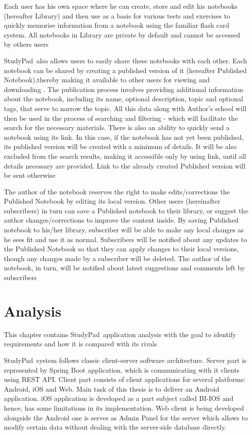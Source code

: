\documentclass[thesis=B,english]{FITthesis}[2012/10/20]
\newcommand{\appname}{StudyPad}
\begin{document}
Each user has his own space where he can create, store and edit his notebooks (hereafter Library) and then use as a basis for various tests and exercises to quickly memorise information from a notebook using the familiar flash card system. All notebooks in Library are private by default and cannot be accessed by others users

\appname\ also allows users to easily share these notebooks with each other. Each notebook can be shared by creating a published version of it (hereafter Published Notebook),thereby making it available to other users for viewing and downloading .
The publication process involves providing additional information about the notebook, including its name, optional description, topic and optional tags, that serve to narrow the topic. All this data along with Author's school will then be used in the process of searching and filtering - which will facilitate the search for the necessary materials. There is also an ability to quickly send a notebook using its link. In this case, if the notebook has not yet been published, its published version will be created with a minimum of details. It will be also excluded from the search results, making it accessible only by using link, until all details necessary are provided. Link to the already created Published version will be sent otherwise


The author of the notebook reserves the right to make edits/corrections the Published Notebook by editing its local version. Other users (hereinafter subscribers) in turn can save a Published notebook to their library, or suggest the author changes/corrections to improve the content inside. By saving Published notebook to his/her library, subscriber will be able to make any local changes as he sees fit and use it as normal. Subscribers will be notified about any updates to the Published Notebook so that they can apply changes to their local versions, though any changes made by a subscriber will be deleted. The author of the notebook, in turn, will be notified about latest suggestions and comments left by subscribers
\chapter{Analysis}
This chapter contains \appname\ application analysis with the goal to identify requirements and how it is compared with its rivals 

\appname\ system follows classic client-server software architecture. Server part is represented by Spring Boot application, which is communicating with it clients using REST API. Client part consists of client applications for several platforms: Android, iOS and Web. Main task of this thesis is to deliver an Android application. iOS application is developed as a part subject called BI-IOS and hence, has some limitations in its implementation. Web client is being developed alongside the Android one is serves as Admin Panel for the server which allows to modify certain data without dealing with the server-side database directly. 
\end{document}
